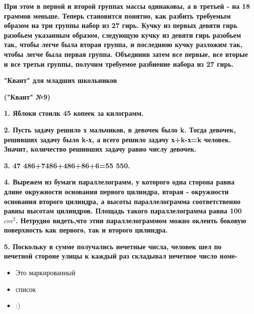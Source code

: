 \begin{multicols}{2}
    \noindent\textbf{При этом в первой и второй группах массы одинаковы, а в третьей - на 18 граммов меньше. Теперь становится понятно, как разбить требуемым образом на три группы набор из 27 гирь. Кучку из первых девяти гирь разобьем указанным образом, следующую кучку из девяти гирь разобьем так, чтобы легче была вторая группа, и последнюю кучку разложим так, чтобы легче была первая группа. Объединив затем все первые, все вторые и все третьи группы, получим требуемое разбиение набора из 27 гирь.}

    \textbf{ }
    
    \noindent\textbf{"Квант" для младших школьников}
    
    \noindent\textbf{("Квант" №9)}

    \noindent\textbf{1. Яблоки стоилк 45 копеек за килограмм.}

    \noindent\textbf{2. Пусть задачу решило х мальчиков, в девочек было k. Тогда девочек, решивших задачу было k-х, а всего решило задачу х+k-х=k человек. Значит, количество решивших задачу равно числу девочек.}

    \noindent\textbf{3. 47 486+7486+486+86+6=55 550.}

    \noindent\textbf{4. Вырежем нз бумаги параллелограмм, у которого одна сторона равна длине окружности основания первого цилиндра, вторая - окружности основания второго цилиндра, а высоты параллелограмма соответственно равны высотам цилиндров. Площадь такого параллелограмма равна 100 $cm^2$. Нетрудно видеть,что этни параллелограммом можно оклеить боковую поверхность как первого, так и второго цилиндра.}

    \noindent\textbf{5. Поскольку в сумме получались нечетные числа, человек шел по нечетной стороне улицы к каждый раз складывал нечетное число номе-}
    \begin{itemize}
  \item Это маркированный
  \item список
  \item :)
\end{itemize}
    
\end{multicols}
